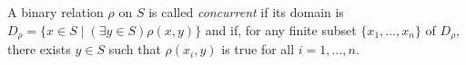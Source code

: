 A binary relation $\rho$ on $S$ is called \emph{concurrent} if its domain is $D_\rho = \{x \in S \mid (\exists y \in S)\rho(x, y)\}$ and if, for any finite subset $\{x_1, \ldots, x_n\}$ of $D_\rho$, there exists $y \in S$ such that $\rho(x_i, y)$ is true for all $i = 1, \ldots, n$.
